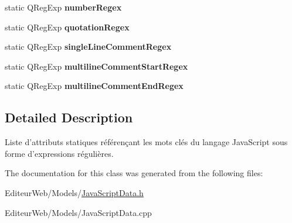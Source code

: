 \begin{DoxyCompactItemize}
\item 
\hypertarget{class_java_script_data_a59a51c1212cc519359161f039aa20bca}{
static QRegExp {\bfseries numberRegex}}
\label{class_java_script_data_a59a51c1212cc519359161f039aa20bca}

\item 
\hypertarget{class_java_script_data_a3df35fef680cb3e25fb21b44647d52fd}{
static QRegExp {\bfseries quotationRegex}}
\label{class_java_script_data_a3df35fef680cb3e25fb21b44647d52fd}

\item 
\hypertarget{class_java_script_data_ad7ab23fe840b14f679d39c8c08529d32}{
static QRegExp {\bfseries singleLineCommentRegex}}
\label{class_java_script_data_ad7ab23fe840b14f679d39c8c08529d32}

\item 
\hypertarget{class_java_script_data_a225cf06133c6abac84588549d60778f2}{
static QRegExp {\bfseries multilineCommentStartRegex}}
\label{class_java_script_data_a225cf06133c6abac84588549d60778f2}

\item 
\hypertarget{class_java_script_data_a89fc558f897ef8f210757f482d65a652}{
static QRegExp {\bfseries multilineCommentEndRegex}}
\label{class_java_script_data_a89fc558f897ef8f210757f482d65a652}

\end{DoxyCompactItemize}


\subsection{Detailed Description}
Liste d'attributs statiques référençant les mots clés du langage JavaScript sous forme d'expressions régulières. 

The documentation for this class was generated from the following files:\begin{DoxyCompactItemize}
\item 
EditeurWeb/Models/\hyperlink{_java_script_data_8h}{JavaScriptData.h}\item 
EditeurWeb/Models/JavaScriptData.cpp\end{DoxyCompactItemize}
